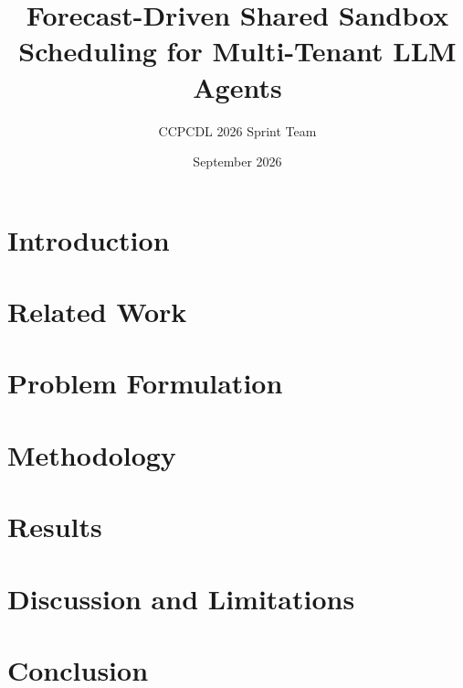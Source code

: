 \documentclass[11pt]{article}
\title{Forecast-Driven Shared Sandbox Scheduling for Multi-Tenant LLM Agents}
\author{CCPCDL 2026 Sprint Team}
\date{September 2026}
\begin{document}
\maketitle

\section{Introduction}


\section{Related Work}


\section{Problem Formulation}


\section{Methodology}


\section{Results}


\section{Discussion and Limitations}


\section{Conclusion}




\end{document}
